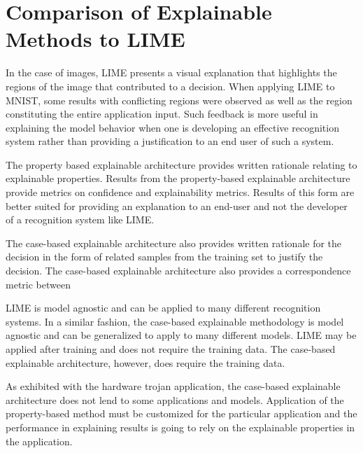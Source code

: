 \section{Comparison of Explainable Methods to LIME}

In the case of images, LIME presents a visual explanation that highlights the
regions of the image that contributed to a decision. When applying LIME to
MNIST, some results with conflicting regions were observed as well as the region
constituting the entire application input.  Such feedback is more useful in
explaining the model behavior when one is developing an effective recognition
system rather than providing a justification to an end user of such a system.

The property based explainable architecture provides written rationale relating
to explainable properties. Results from the property-based explainable
architecture provide metrics on confidence and explainability metrics. Results
of this form are better suited for providing an explanation to an end-user and
not the developer of a recognition system like LIME.


The case-based explainable architecture also provides written rationale for the
decision in the form of related samples from the training set to justify the decision.
The case-based explainable architecture also provides a correspondence metric between

LIME is model agnostic and can be applied to many different recognition systems.
In a similar fashion, the case-based explainable methodology is model agnostic
and can be generalized to apply to many different models. LIME may be applied
after training and does not require the training data.  The case-based
explainable architecture, however, does require the training data.

As exhibited with the hardware trojan application, the case-based explainable
architecture does not lend to some applications and models.  Application of
the property-based method must be customized for the particular application
and the performance in explaining results is going to rely on the explainable
properties in the application.
